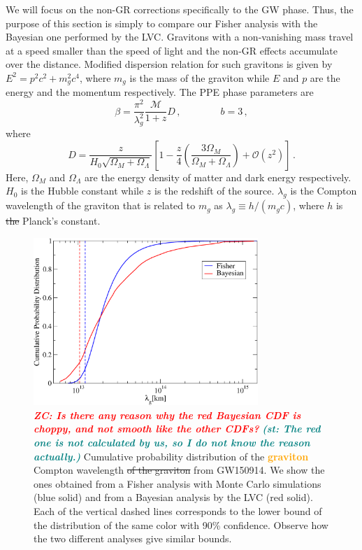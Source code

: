 \documentclass[prd,twocolumn,nofootinbib]{revtex4-1}
\newcommand\be{\begin{equation}}
\newcommand\ee{\end{equation}}
\newcommand{\lb}{\left(}
\newcommand{\rb}{\right)}
\newcommand{\shammi}[1]{\textcolor{teal}{\it{\textbf{(st: #1)}}} }
\newcommand{\zc}[1]{\textcolor{red}{\it{\textbf{ZC: #1}}} }
\newcommand{\zack}[1]{\textcolor{orange}{\textbf{#1}} }
\begin{document}
We will focus on the non-GR corrections specifically to the GW phase. Thus, the purpose of this section is simply to compare our Fisher analysis with the Bayesian one performed by the LVC. Gravitons with a non-vanishing mass travel at a speed smaller than the speed of light and the non-GR effects accumulate over the distance. Modified dispersion relation for such gravitons is given by $ E^2=p^2c^2+m_g^2c^4$, where $m_g$ is the mass of the graviton while $E$ and $p$ are the energy and the momentum respectively. The PPE phase parameters are~\cite{Will:1997bb}
\be
\beta=\frac{\pi^2}{\lambda_g^2}\frac{\mathcal{M}}{1+z}D\,, \qquad \qquad b=3\,,
\ee
where
\be
D=\frac{z}{H_0\sqrt{\Omega_M+\Omega_{\Lambda}}}\left[1-\frac{z}{4}\left(\frac{3\Omega_M}{\Omega_M+\Omega_{\Lambda}} \right )+\mathcal{O}(z^2)\right]\,.
\ee
Here, $\Omega_M$ and $\Omega_\Lambda$ are the energy density of matter and dark energy respectively. $H_0$ is the Hubble constant while $z$ is the redshift of the source. $\lambda_g$ is the Compton wavelength of the graviton that is related to $m_g$ as $\lambda_g\equiv h/\lb m_gc\rb$, where $h$ is \sout{the} Planck's constant.

\begin{figure}[htb]
\includegraphics[width=8.5cm]{graviton.pdf}
\caption{\zc{Is there any reason why the red Bayesian CDF is choppy, and not smooth like the other CDFs?} \shammi{The red one is not calculated by us, so I do not know the reason actually.}Cumulative probability distribution of the \zack{graviton} Compton wavelength \sout{of the graviton} from GW150914. We show the ones obtained from a Fisher analysis with Monte Carlo simulations (blue solid) and from a Bayesian analysis by the LVC (red solid). Each of the vertical dashed lines corresponds to the lower bound of the distribution of the same color with 90\% confidence. Observe how the two different analyses give similar bounds.}
\label{fig:graviton}
\end{figure}
\end{document}
